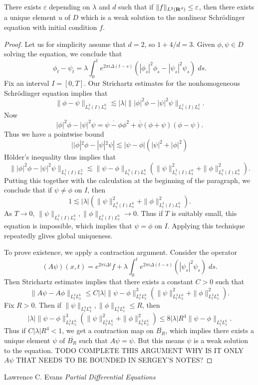 \begin{lemma}
    There exists $\varepsilon$ depending on $\lambda$ and $d$ such that if $\| f \|_{L^2(\operatorname{\mathbf{R}}^d)} \leq \varepsilon$, then there exists a unique element $u$ of $D$ which is a weak solution to the nonlinear Schr\"{o}dinger equation with initial condition $f$.
\end{lemma}
\begin{proof}
  Let us for simplicity assume that $d = 2$, so $1 + 4/d = 3$. Given $\phi,\psi \in D$ solving the equation, we conclude that
  \[ \phi_t - \psi_t = \lambda \int_0^t e^{2 \pi i \Delta (t - s)} \left( |\phi_s|^2 \phi_s - |\psi_s|^2 \psi_s \right)\; ds. \]
  Fix an interval $I = [0,T]$. Our Strichartz estimates for the nonhomogeneous Schr\"{o}dinger equation implies that
  \[ \| \phi - \psi \|_{L^3_t(I) L^6_x} \lesssim |\lambda| \| |\phi|^2 \phi - |\psi|^2 \psi\|_{L^1_t(I) L^2_x}. \]
  Now
  \[ |\phi|^2 \phi - |\psi|^2 \psi = \overline{\psi - \phi} \phi^2 + \overline{\psi} (\phi + \psi)(\phi - \psi). \]
  Thus we have a pointwise bound
  \[ ||\phi|^2 \phi - |\psi|^2 \psi| \lesssim |\psi - \phi| (|\psi|^2 + |\phi|^2) \]
  H\"{o}lder's inequality thus implies that
  \[ \| |\phi|^2 \phi - |\psi|^2 \psi\|_{L^1_t(I) L^2_x} \lesssim \| \psi - \phi \|_{L^3_t(I) L^6_x} \left( \| \psi \|_{L^3_t(I) L^6_x}^2 + \| \phi \|_{L^3_t(I) L^6_x}^2 \right). \]
  Putting this together with the calculation at the beginning of the paragraph, we conclude that if $\psi \neq \phi$ on $I$, then
  \[ 1 \lesssim |\lambda| \left( \| \psi \|_{L^3_t(I) L^6_x}^2 + \| \phi \|_{L^3_t(I) L^6_x}^2 \right). \]
  As $T \to 0$, $\| \psi \|_{L^3_t(I) L^6_x}, \| \phi \|_{L^3_t(I) L^6_x} \to 0$. Thus if $T$ is suitably small, this equation is impossible, which implies that $\psi = \phi$ on $I$. Applying this technique repeatedly glives global uniqueness.

  To prove existence, we apply a contraction argument. Consider the operator
  \[ (A \psi)(x,t) = e^{2 \pi i \Delta t} f + \lambda \int_0^t e^{2 \pi i \Delta (t - s)} ( |\psi_s|^2 \psi_s )\; ds. \]
  Then Strichartz estimates implies that there exists a constant $C > 0$ such that
  \[ \| A \psi - A \phi \|_{L^3_t L^6_x} \leq C |\lambda| \| \psi - \phi \|_{L^3_t L^6_x}^3 \left( \| \psi \|_{L^3_t L^6_x}^2 + \| \phi \|_{L^3_t L^6_x}^2 \right). \]
  Fix $R > 0$. Then if $\| \psi \|_{L^3_t L^6_x}, \| \phi \|_{L^3_t L^6_x} \leq R$, then
  \[ |\lambda| \| \psi - \phi \|_{L^3_t L^6_x}^3 \left( \| \psi \|_{L^3_t L^6_x}^2 + \| \phi \|_{L^3_t L^6_x}^2 \right) \leq 8|\lambda| R^4 \| \psi - \phi \|_{L^3_t L^6_x}. \]
  Thus if $C |\lambda| R^4 < 1$, we get a contraction map on $\overline{B_R}$, which implies there exists a unique element $\psi$ of $\overline{B_R}$ such that $A\psi = \psi$. But this means $\psi$ is a weak solution to the equation. TODO COMPLETE THIS ARGUMENT WHY IS IT ONLY $A\psi$ THAT NEEDS TO BE BOUNDED IN SERGEY'S NOTES?
\end{proof}








\begin{thebibliography}{9}

Lawrence C. Evans
\textit{Partial Differential Equations}

\end{thebibliography}

 